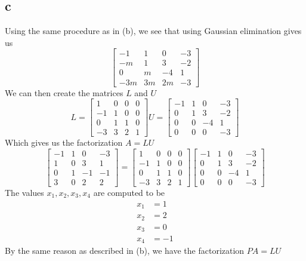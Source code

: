 \documentclass[12pt]{article}
\begin{document}
\subsection*{c}
Using the same procedure as in (b), we see that using Gaussian elimination gives us
$$
\begin{bmatrix}
-1 & 1 & 0 & -3\\
-m & 1 & 3 & -2 \\
0 & m & -4 & 1 \\
-3m & 3m & 2m & -3
\end{bmatrix}
$$
We can then create the matrices $L$ and $U$
$$
L
=
\begin{bmatrix}
1 & 0 & 0 & 0\\
-1 & 1 & 0 & 0 \\
0 & 1 & 1 & 0 \\
-3 & 3 & 2 & 1
\end{bmatrix}
U
=
\begin{bmatrix}
-1 & 1 & 0 & -3\\
0 & 1 & 3 & -2 \\
0 & 0 & -4 & 1 \\
0 & 0 & 0 & -3
\end{bmatrix}
$$
Which gives us the factorization $A=LU$
$$
\begin{bmatrix}
-1 & 1 & 0 & -3\\
1 & 0 & 3 & 1 \\
0 & 1 & -1 & -1 \\
3 & 0 & 2 & 2
\end{bmatrix}
=
\begin{bmatrix}
1 & 0 & 0 & 0\\
-1 & 1 & 0 & 0 \\
0 & 1 & 1 & 0 \\
-3 & 3 & 2 & 1
\end{bmatrix}
\begin{bmatrix}
-1 & 1 & 0 & -3\\
0 & 1 & 3 & -2 \\
0 & 0 & -4 & 1 \\
0 & 0 & 0 & -3
\end{bmatrix}
$$
The values $x_1,x_2,x_3,x_4$ are computed to be
\begin{align*}
x_1&=1 \\
x_2&=2 \\
x_3&=0 \\
x_4&=-1
\end{align*}
By the same reason as described in (b), we have the factorization $PA=LU$
\end{document}
